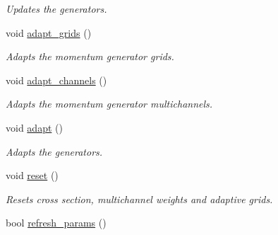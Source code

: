 \begin{DoxyCompactItemize}
\begin{DoxyCompactList}\small\item\em Updates the generators. \end{DoxyCompactList}\item 
\hypertarget{a00430_a4624c85bb2c5a4c720d3944944fff482}{void \hyperlink{a00430_a4624c85bb2c5a4c720d3944944fff482}{adapt\-\_\-grids} ()}\label{a00430_a4624c85bb2c5a4c720d3944944fff482}

\begin{DoxyCompactList}\small\item\em Adapts the momentum generator grids. \end{DoxyCompactList}\item 
\hypertarget{a00430_acb541bb6c5b63fae01ff147f4cd2823f}{void \hyperlink{a00430_acb541bb6c5b63fae01ff147f4cd2823f}{adapt\-\_\-channels} ()}\label{a00430_acb541bb6c5b63fae01ff147f4cd2823f}

\begin{DoxyCompactList}\small\item\em Adapts the momentum generator multichannels. \end{DoxyCompactList}\item 
\hypertarget{a00430_a7f97f414b5f3d689efb551aa4f6b1d1c}{void \hyperlink{a00430_a7f97f414b5f3d689efb551aa4f6b1d1c}{adapt} ()}\label{a00430_a7f97f414b5f3d689efb551aa4f6b1d1c}

\begin{DoxyCompactList}\small\item\em Adapts the generators. \end{DoxyCompactList}\item 
\hypertarget{a00430_aa2cd6b9887022d49cd48497b8061c54d}{void \hyperlink{a00430_aa2cd6b9887022d49cd48497b8061c54d}{reset} ()}\label{a00430_aa2cd6b9887022d49cd48497b8061c54d}

\begin{DoxyCompactList}\small\item\em Resets cross section, multichannel weights and adaptive grids. \end{DoxyCompactList}\item 
\hypertarget{a00430_a097bfddf2a2231b766b93649075372b3}{bool \hyperlink{a00430_a097bfddf2a2231b766b93649075372b3}{refresh\-\_\-params} ()}\label{a00430_a097bfddf2a2231b766b93649075372b3}


\end{DoxyCompactItemize}
